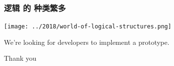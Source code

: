 \documentclass[17pt]{beamer}
\begin{document}
\begin{frame}
\frametitle{逻辑 的 种类繁多}
\texttt{[image: ../2018/world-of-logical-structures.png]}
\end{frame}

\begin{frame}
We're looking for developers to implement a prototype.

\vspace*{1cm}
\Large{\centerline{Thank you}}

\end{frame}
\end{document}
